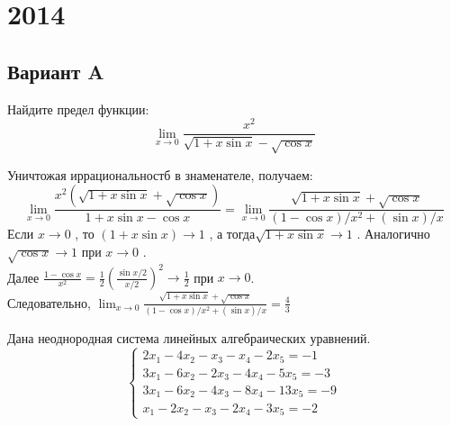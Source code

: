 \documentclass[addpoints, answers]{exam} %
\begin{document}
\section{2014}
\subsection{Вариант A}
\begin{questions}

\question Найдите предел функции:
\[\lim_{x\to0}\frac{x^2}{\sqrt{1+x\sin x}-\sqrt{\cos x}}\]

\begin{solution}
Уничтожая иррациональностб в знаменателе, получаем:\\
\[
\lim_{x\to0}\frac{x^2(\sqrt{1+x\sin x}+\sqrt{\cos x})}{1+x\sin x-\cos x}=\lim_{x\to0}\frac{\sqrt{1+x\sin x}+\sqrt{\cos x}}{(1-\cos x)/x^2+(\sin x)/x}
\]
Если $x \to 0 $ , то $(1+x\sin x) \to 1$  , а тогда$\sqrt{1+x \sin x}\to 1$  . Аналогично $\sqrt{\cos x}\to 1$ при $x \to 0$ . \\
Далее $\frac{1-\cos x}{x^2}=\frac12 (\frac{\sin x/2}{x/2})^2\to \frac12$  при  $x \to 0$.\\ Следовательно, $\lim_{x\to0}\frac{\sqrt{1+x\sin x}+\sqrt{\cos x}}{(1-\cos x)/x^2+(\sin x)/x} = \frac43$
\end{solution}

\question Дана неоднородная система линейных алгебраических уравнений.\[\begin{cases}
2x_1-4x_2-x_3-x_4-2x_5=-1\\
3x_1-6x_2-2x_3-4x_4-5x_5=-3\\
3x_1-6x_2-4x_3-8x_4-13x_5=-9\\
x_1-2x_2-x_3-2x_4-3x_5=-2
\end{cases}\]
\end{questions}
\end{document}
